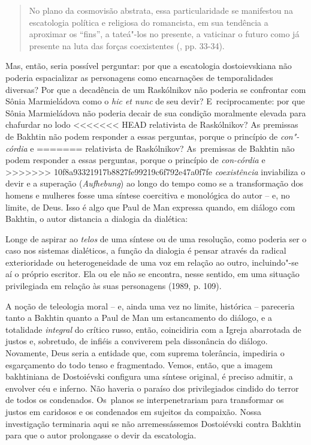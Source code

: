 {{\begin{quote}
No plano da cosmovisão abstrata, essa particularidade se manifestou na
escatologia política e religiosa do romancista, em sua tendência a
aproximar os ``fins'', a tateá"-los no presente, a vaticinar o futuro
como já presente na luta das forças coexistentes (, pp. 33-34).
\end{quote}

Mas, então, seria possível perguntar: por que a escatologia
dostoievskiana não poderia espacializar as personagens como encarnações
de temporalidades diversas? Por que a decadência de um Raskólnikov não
poderia se confrontar com Sônia Marmieládova como o \emph{hic et nunc}
de seu devir? E~reciprocamente: por que Sônia Marmieládova não poderia
decair de sua condição moralmente elevada para chafurdar no lodo
<<<<<<< HEAD
relativista de Raskólnikov? As premissas de Bakhtin não podem responder
a essas perguntas, porque o princípio de \emph{con"-córdia} e
=======
relativista de Raskólnikov? As~premissas de Bakhtin não podem responder
a essas perguntas, porque o princípio de \emph{con-córdia} e
>>>>>>> 10f8a93321917b8827fe99219c6f792e47a0f7fe
\emph{coexistência} inviabiliza o devir e a superação (\emph{Aufhebung})
ao longo do tempo como se a transformação dos homens e mulheres fosse
uma síntese coercitiva e monológica do autor -- e, no limite, de Deus.
Isso é algo que Paul de Man expressa quando, em diálogo com Bakhtin, o
autor distancia a dialogia da dialética:

Longe de aspirar ao \emph{telos} de uma síntese ou de uma resolução,
como poderia ser o caso nos sistemas dialéticos, a função da dialogia é
pensar através da radical exterioridade ou heterogeneidade de uma voz em
relação ao outro, incluindo"-se aí o próprio escritor. Ela ou ele não se
encontra, nesse sentido, em uma situação privilegiada em relação às suas
personagens (1989, p. 109).

A noção de teleologia moral -- e, ainda uma vez no limite, histórica --
pareceria tanto a Bakhtin quanto a Paul de Man um estancamento do
diálogo, e a totalidade \emph{integral} do crítico russo, então,
coincidiria com a Igreja abarrotada de justos e, sobretudo, de infiéis a
conviverem pela dissonância do diálogo. Novamente, Deus seria a entidade
que, com suprema tolerância, impediria o esgarçamento do todo tenso e
fragmentado. Vemos, então, que a imagem bakhtiniana de Dostoiévski
configura uma síntese original, é preciso admitir, a envolver céu e
inferno. Não haveria o paraíso dos privilegiados cindido do terror de
todos os condenados. Os~planos se interpenetrariam para transformar os
justos em caridosos e os condenados em sujeitos da compaixão. Nossa
investigação terminaria aqui se não arremessássemos Dostoiévski contra
Bakhtin para que o autor prolongasse o devir da escatologia.

}}

